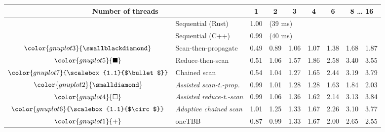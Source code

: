\begin{tabular}{clrrrrrrr}
\toprule
\multicolumn{2}{c}{\textbf{Number of threads}} & \multicolumn{1}{c}{\textbf{ 1 }} & \multicolumn{1}{c}{\textbf{ 2 }} & \multicolumn{1}{c}{\textbf{ 3 }} & \multicolumn{1}{c}{\textbf{ 4 }} & \multicolumn{1}{c}{\textbf{ 6 }} & \multicolumn{2}{c}{\textbf{ 8 } \dots \textbf{ 16 }} \\
\midrule
& Sequential (Rust) & \multicolumn{1}{r}{ 1.00 } & \multicolumn{ 6 }{l}{(39 ms)} \\
& Sequential (C++) & \multicolumn{1}{r}{ 0.99 } & \multicolumn{ 6 }{l}{(40 ms)} \\
\rowcolor{gnuplot3!10}$\color{gnuplot3}{\smallblackdiamond}$ & Scan-then-propagate & \cellcolor{gnuplot3!10} 0.49 & \cellcolor{gnuplot3!10} 0.89 & \cellcolor{gnuplot3!10} 1.06 & \cellcolor{gnuplot3!10} 1.07 & \cellcolor{gnuplot3!10} 1.38 & \cellcolor{gnuplot3!10} 1.68 & \cellcolor{gnuplot3!10} 1.87 \\
\rowcolor{gnuplot5!10}$\color{gnuplot5}{\blacksquare}$ & Reduce-then-scan & \cellcolor{gnuplot5!10} 0.51 & \cellcolor{gnuplot5!10} 1.06 & \cellcolor{gnuplot5!10} 1.57 & \cellcolor{gnuplot5!10} 1.86 & \cellcolor{gnuplot5!10} 2.58 & \cellcolor{gnuplot5!10} 3.40 & \cellcolor{gnuplot5!10} 3.55 \\
\rowcolor{gnuplot7!10}$\color{gnuplot7}{\scalebox{1.1}{$\bullet$}}$ & Chained scan & \cellcolor{gnuplot7!10} 0.54 & \cellcolor{gnuplot7!10} 1.04 & \cellcolor{gnuplot7!10} 1.27 & \cellcolor{gnuplot7!10} 1.65 & \cellcolor{gnuplot7!10} 2.44 & \cellcolor{gnuplot7!10} 3.19 & \cellcolor{gnuplot7!10} 3.79 \\
\rowcolor{gnuplot2!30}$\color{gnuplot2}{\smalldiamond}$ & \textit{Assisted scan-t.-prop.} & \cellcolor{gnuplot2!30} 0.99 & \cellcolor{gnuplot2!30} 1.01 & \cellcolor{gnuplot2!30} 1.28 & \cellcolor{gnuplot2!30} 1.28 & \cellcolor{gnuplot2!30} 1.63 & \cellcolor{gnuplot2!30} 1.84 & \cellcolor{gnuplot2!30} 2.03 \\
\rowcolor{gnuplot4!30}$\color{gnuplot4}{\square}$ & \textit{Assisted reduce-t.-scan} & \cellcolor{gnuplot4!30} 0.99 & \cellcolor{gnuplot4!30} 1.06 & \cellcolor{gnuplot4!30} 1.36 & \cellcolor{gnuplot4!30} 1.62 & \cellcolor{gnuplot4!30} 2.14 & \cellcolor{gnuplot4!30} 3.13 & \cellcolor{gnuplot4!30} 3.84 \\
\rowcolor{gnuplot6!30}$\color{gnuplot6}{\scalebox{1.1}{$\circ$}}$ & \textit{Adaptive chained scan} & \cellcolor{gnuplot6!30} 1.01 & \cellcolor{gnuplot6!30} 1.25 & \cellcolor{gnuplot6!30} 1.33 & \cellcolor{gnuplot6!30} 1.67 & \cellcolor{gnuplot6!30} 2.26 & \cellcolor{gnuplot6!30} 3.10 & \cellcolor{gnuplot6!30} 3.77 \\
\rowcolor{gnuplot1!10}$\color{gnuplot1}{+}$ & oneTBB & \cellcolor{gnuplot1!10} 0.87 & \cellcolor{gnuplot1!10} 0.99 & \cellcolor{gnuplot1!10} 1.33 & \cellcolor{gnuplot1!10} 1.67 & \cellcolor{gnuplot1!10} 2.00 & \cellcolor{gnuplot1!10} 2.65 & \cellcolor{gnuplot1!10} 2.55 \\
\bottomrule
\end{tabular}
